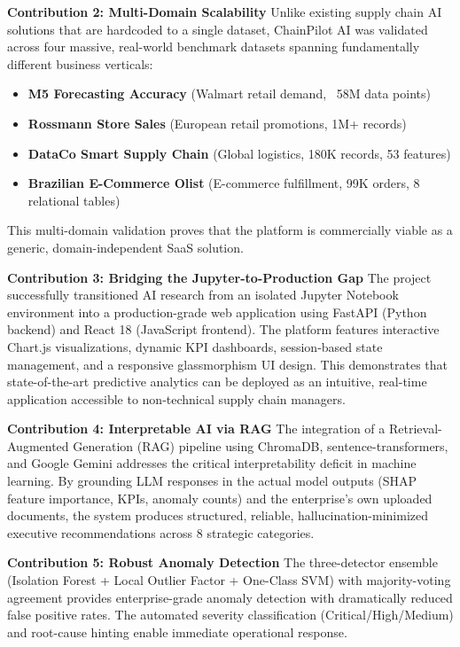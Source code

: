 \documentclass[12pt, a4paper]{report}
\begin{document}
\textbf{Contribution 2: Multi-Domain Scalability}
Unlike existing supply chain AI solutions that are hardcoded to a single dataset, ChainPilot AI was validated across four massive, real-world benchmark datasets spanning fundamentally different business verticals:
\begin{itemize}
\item \textbf{M5 Forecasting Accuracy} (Walmart retail demand, ~58M data points)
\item \textbf{Rossmann Store Sales} (European retail promotions, 1M+ records)
\item \textbf{DataCo Smart Supply Chain} (Global logistics, 180K records, 53 features)
\item \textbf{Brazilian E-Commerce Olist} (E-commerce fulfillment, 99K orders, 8 relational tables)
\end{itemize}

This multi-domain validation proves that the platform is commercially viable as a generic, domain-independent SaaS solution.

\textbf{Contribution 3: Bridging the Jupyter-to-Production Gap}
The project successfully transitioned AI research from an isolated Jupyter Notebook environment into a production-grade web application using FastAPI (Python backend) and React 18 (JavaScript frontend). The platform features interactive Chart.js visualizations, dynamic KPI dashboards, session-based state management, and a responsive glassmorphism UI design. This demonstrates that state-of-the-art predictive analytics can be deployed as an intuitive, real-time application accessible to non-technical supply chain managers.

\textbf{Contribution 4: Interpretable AI via RAG}
The integration of a Retrieval-Augmented Generation (RAG) pipeline using ChromaDB, sentence-transformers, and Google Gemini addresses the critical interpretability deficit in machine learning. By grounding LLM responses in the actual model outputs (SHAP feature importance, KPIs, anomaly counts) and the enterprise's own uploaded documents, the system produces structured, reliable, hallucination-minimized executive recommendations across 8 strategic categories.

\textbf{Contribution 5: Robust Anomaly Detection}
The three-detector ensemble (Isolation Forest + Local Outlier Factor + One-Class SVM) with majority-voting agreement provides enterprise-grade anomaly detection with dramatically reduced false positive rates. The automated severity classification (Critical/High/Medium) and root-cause hinting enable immediate operational response.
\end{document}
